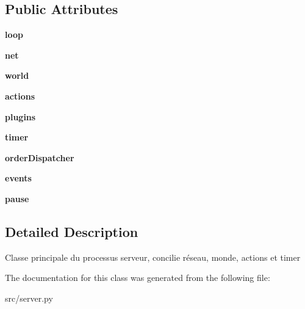 \subsection*{\-Public \-Attributes}
\begin{DoxyCompactItemize}
\item 
\hypertarget{classserver_1_1_server_aa66c4b037c112c4777cdc3d0b021bf0a}{{\bfseries loop}}\label{classserver_1_1_server_aa66c4b037c112c4777cdc3d0b021bf0a}

\item 
\hypertarget{classserver_1_1_server_a7c744a2e1c5d36f4e41ee16b15eddec0}{{\bfseries net}}\label{classserver_1_1_server_a7c744a2e1c5d36f4e41ee16b15eddec0}

\item 
\hypertarget{classserver_1_1_server_afb24f0dc3380595ca5fa1e3720eddf91}{{\bfseries world}}\label{classserver_1_1_server_afb24f0dc3380595ca5fa1e3720eddf91}

\item 
\hypertarget{classserver_1_1_server_ac18f6cc461c554eb4f5975bae585beb1}{{\bfseries actions}}\label{classserver_1_1_server_ac18f6cc461c554eb4f5975bae585beb1}

\item 
\hypertarget{classserver_1_1_server_a173029dc00b8683b075d277c668617b9}{{\bfseries plugins}}\label{classserver_1_1_server_a173029dc00b8683b075d277c668617b9}

\item 
\hypertarget{classserver_1_1_server_a648310f189b51c6fe5b0c9b925c638ae}{{\bfseries timer}}\label{classserver_1_1_server_a648310f189b51c6fe5b0c9b925c638ae}

\item 
\hypertarget{classserver_1_1_server_a7bef2487ef91bc73d3c7686ddd42daf2}{{\bfseries order\-Dispatcher}}\label{classserver_1_1_server_a7bef2487ef91bc73d3c7686ddd42daf2}

\item 
\hypertarget{classserver_1_1_server_a59d51ebb6587b77ef52a1f2533a0c7a8}{{\bfseries events}}\label{classserver_1_1_server_a59d51ebb6587b77ef52a1f2533a0c7a8}

\item 
\hypertarget{classserver_1_1_server_a7e6fa74117ab619b24b38bedb698b26e}{{\bfseries pause}}\label{classserver_1_1_server_a7e6fa74117ab619b24b38bedb698b26e}

\end{DoxyCompactItemize}


\subsection{\-Detailed \-Description}
\begin{DoxyVerb}Classe principale du processus serveur, concilie réseau, monde, actions et timer \end{DoxyVerb}
 

\-The documentation for this class was generated from the following file\-:\begin{DoxyCompactItemize}
\item 
src/server.\-py\end{DoxyCompactItemize}
